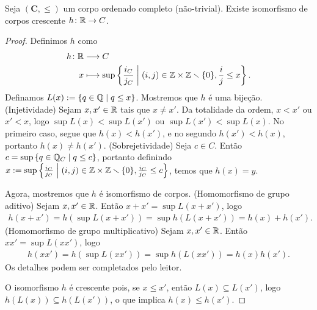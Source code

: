 \begin{proposition}
Seja $(\bm C,\leq)$ um corpo ordenado completo (não-trivial). Existe isomorfismo de corpos crescente  $h\colon \mathbb{R} \to C$.
\end{proposition}
\begin{proof}
Definimos $h$ como
	\begin{align*}
	{h}\colon {\mathbb{R}} &\longrightarrow {C} \\{x} &\longmapsto \sup \left\{{\frac{i_C}{j_C}}\;\middle\vert\;{(i,j) \in \mathbb{Z} \times \mathbb{Z} \smallsetminus \{0\}, \frac{i}{j} \leq x}\right\}.
	\end{align*}
Definamos $L(x) := \left\{{q \in \mathbb{Q}}\;\middle\vert\;{q \leq x}\right\}$. Mostremos que $h$ é uma bijeção. (Injetividade) Sejam $x,x' \in \mathbb{R}$ tais que $x \neq x'$. Da totalidade da ordem, $x < x'$ ou $x' < x$, logo $\sup L(x) < \sup L(x')$ ou $\sup L(x') < \sup L(x)$. No primeiro caso, segue que $h(x) < h(x')$, e no segundo $h(x') < h(x)$, portanto $h(x) \neq h(x')$. (Sobrejetividade) Seja $c \in C$. Então $c = \sup \left\{{q \in \mathbb{Q}_C}\;\middle\vert\;{q \leq c}\right\}$, portanto definindo $x := \sup \left\{{\frac{i_C}{j_C}}\;\middle\vert\;{(i,j) \in \mathbb{Z} \times \mathbb{Z} \smallsetminus \{0\}, \frac{i_C}{j_C} \leq c}\right\}$, temos que $h(x)=y$.

Agora, mostremos que $h$ é isomorfismo de corpos. (Homomorfismo de grupo aditivo) Sejam $x,x' \in \mathbb{R}$. Então $x+x' = \sup L(x+x')$, logo
	\begin{align*}
	h(x+x') = h(\sup L(x+x')) = \sup h(L(x+x')) = h(x) + h(x').
	\end{align*}
(Homomorfismo de grupo multiplicativo) Sejam $x,x' \in \mathbb{R}$. Então $xx' = \sup L(xx')$, logo
	\begin{align*}
	h(xx') = h(\sup L(xx')) = \sup h(L(xx')) = h(x)h(x').
	\end{align*}
Os detalhes podem ser completados pelo leitor.

O isomorfismo $h$ é crescente pois, se $x \leq x'$, então $L(x) \subseteq L(x')$, logo $h(L(x)) \subseteq h(L(x'))$, o que implica $h(x) \leq h(x')$.
\end{proof}

